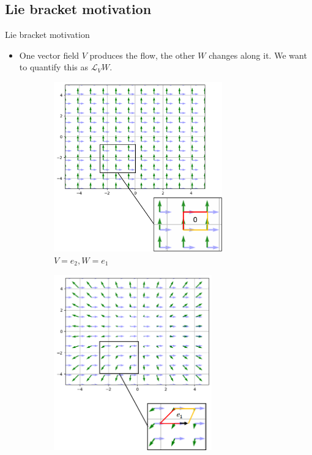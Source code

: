 \documentclass{beamer}
\begin{document}
\subsection{Lie bracket motivation}
\begin{frame}{Lie bracket motivation}
    \begin{itemize}
        \item One vector field $V$ produces the flow, the other $W$ changes along it. We want to quantify this as $\mathcal{L}_V W$. 
    \end{itemize}
    \begin{figure}[h!]
        \begin{subfigure}{.5\textwidth}
            \centering  
            \includegraphics[width=0.8\textwidth]{images/lie_1.png}
            \caption{$V=e_2, W=e_1$}
            \label{fig:sub1}
        \end{subfigure}%
        \begin{subfigure}{.5\textwidth}
            \centering   
            \includegraphics[width=0.75\textwidth]{images/lie_2.png}

\end{subfigure}
\end{figure}
\end{frame}
\end{document}
